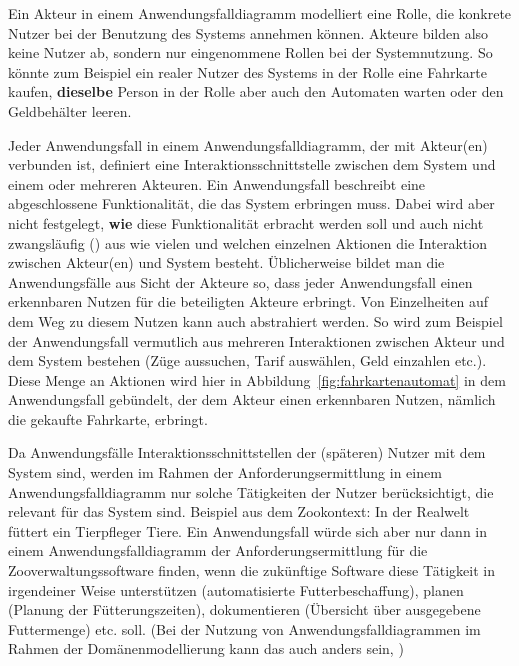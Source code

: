 Ein  Akteur in einem Anwendungsfalldiagramm modelliert eine Rolle, die konkrete Nutzer bei der Benutzung des Systems annehmen können. Akteure bilden also keine Nutzer ab, sondern nur eingenommene Rollen bei der Systemnutzung. So könnte zum Beispiel ein realer Nutzer des Systems in der Rolle  eine Fahrkarte kaufen, \textbf{dieselbe} Person in der Rolle  aber auch den Automaten warten oder den Geldbehälter leeren.

Jeder Anwendungsfall in einem Anwendungsfalldiagramm, der mit Akteur(en) verbunden ist, definiert eine Interaktionsschnittstelle zwischen dem System und einem oder mehreren Akteuren. Ein Anwendungsfall beschreibt eine abgeschlossene Funktionalität, die das System erbringen muss. Dabei wird aber nicht festgelegt, \textbf{wie} diese Funktionalität erbracht werden soll und auch nicht zwangsläufig (\su) aus wie vielen und welchen einzelnen Aktionen die Interaktion zwischen Akteur(en) und System besteht. Üblicherweise bildet man die Anwendungsfälle aus Sicht der Akteure so, dass jeder Anwendungsfall einen erkennbaren Nutzen für die beteiligten Akteure erbringt. Von Einzelheiten auf dem Weg zu diesem Nutzen kann auch abstrahiert werden. So wird zum Beispiel der Anwendungsfall  vermutlich aus mehreren Interaktionen zwischen Akteur  und dem System bestehen (\mbox{Züge} aussuchen, Tarif auswählen, Geld einzahlen etc.). Diese Menge an Aktionen wird hier in Abbildung~\ref{fig:fahrkartenautomat} in dem Anwendungsfall  gebündelt, der dem Akteur  einen erkennbaren Nutzen, nämlich die gekaufte Fahrkarte, erbringt.

\pagebreak %

Da Anwendungsfälle Interaktionsschnittstellen der (späteren) Nutzer mit dem System sind, werden im Rahmen der Anforderungsermittlung in einem Anwendungsfalldiagramm nur solche Tätigkeiten der Nutzer berücksichtigt, die relevant für das System sind. Beispiel aus dem Zookontext: In der Realwelt füttert ein Tierpfleger Tiere. Ein Anwendungsfall  würde sich aber nur dann in einem Anwendungsfalldiagramm der Anforderungsermittlung für die Zooverwaltungssoftware finden, wenn die zukünftige Software diese Tätigkeit in irgendeiner Weise unterstützen (\zb automatisierte Futterbeschaffung), planen (\zb Planung der Fütterungszeiten), dokumentieren (\zb Übersicht über ausgegebene Futtermenge) etc. soll. (Bei der Nutzung von Anwendungsfalldiagrammen im Rahmen der Domänenmodellierung kann das auch anders sein, \su)

